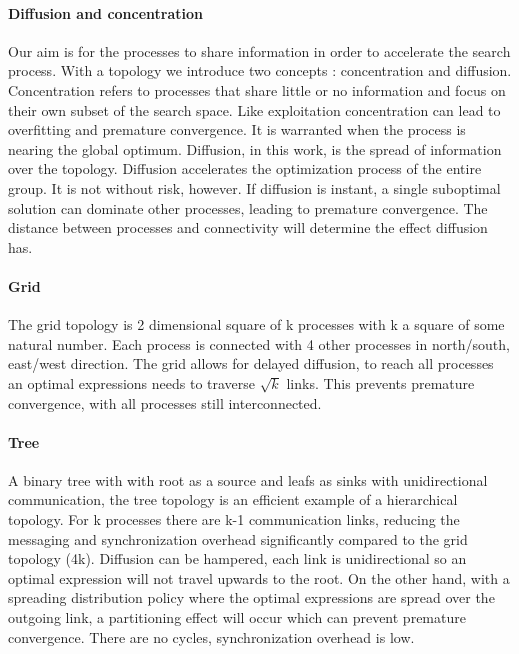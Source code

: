 \paragraph{Diffusion and concentration}
Our aim is for the processes to share information in order to accelerate the search process. With a topology we introduce two concepts : concentration and diffusion. Concentration refers to processes that share little or no information and focus on their own subset of the search space. Like exploitation concentration can lead to overfitting and premature convergence. It is warranted when the process is nearing the global optimum. Diffusion, in this work, is the spread of information over the topology. Diffusion accelerates the optimization process of the entire group. It is not without risk, however. If diffusion is instant, a single suboptimal solution can dominate other processes, leading to premature convergence. The distance between processes and connectivity will determine the effect diffusion has.
\paragraph{Grid}
The grid topology is 2 dimensional square of k processes with k a square of some natural number. Each process is connected with 4 other processes in north/south, east/west direction. The grid allows for delayed diffusion, to reach all processes an optimal expressions needs to traverse $\sqrt{k}$ links. This prevents premature convergence, with all processes still interconnected.
\paragraph{Tree}
A binary tree with with root as a source and leafs as sinks with unidirectional communication, the tree topology is an efficient example of a hierarchical topology. For k processes there are k-1 communication links, reducing the messaging and synchronization overhead significantly compared to the grid topology (4k). Diffusion can be hampered, each link is unidirectional so an optimal expression will not travel upwards to the root. On the other hand, with a spreading distribution policy where the optimal expressions are spread over the outgoing link, a partitioning effect will occur which can prevent premature convergence. There are no cycles, synchronization overhead is low.

